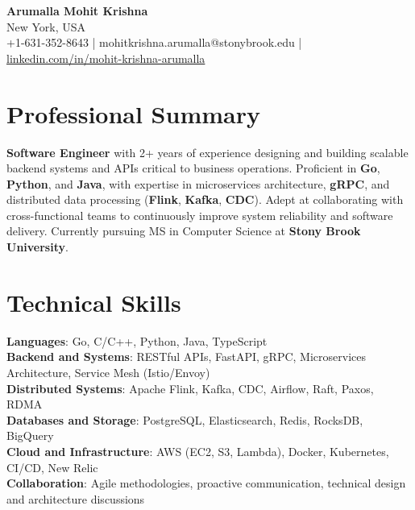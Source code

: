 \documentclass[letterpaper,11pt]{article}
\begin{document}
\begin{center}
  {\Large \textbf{Arumalla Mohit Krishna}} \\
  New York, USA \\
  +1-631-352-8643 \enspace | \enspace mohitkrishna.arumalla@stonybrook.edu \enspace | \enspace \href{https://www.linkedin.com/in/mohit-krishna-arumalla}{linkedin.com/in/mohit-krishna-arumalla}
\end{center}

\section{Professional Summary}
  \begin{itemize}[leftmargin=0.15in, label={}]
    \small{\item{
     \textbf{Software Engineer} with 2+ years of experience designing and building scalable backend systems and APIs critical to business operations. Proficient in \textbf{Go}, \textbf{Python}, and \textbf{Java}, with expertise in microservices architecture, \textbf{gRPC}, and distributed data processing (\textbf{Flink}, \textbf{Kafka}, \textbf{CDC}). Adept at collaborating with cross-functional teams to continuously improve system reliability and software delivery. Currently pursuing MS in Computer Science at \textbf{Stony Brook University}.
    }}
  \end{itemize}
\vspace{-16pt}

\section{Technical Skills}
 \begin{itemize}[leftmargin=0.15in, label={}]
    \small{\item{
     \textbf{Languages}: Go, C/C++, Python, Java, TypeScript \\
     \textbf{Backend and Systems}: RESTful APIs, FastAPI, gRPC, Microservices Architecture, Service Mesh (Istio/Envoy) \\
     \textbf{Distributed Systems}: Apache Flink, Kafka, CDC, Airflow, Raft, Paxos, RDMA \\
     \textbf{Databases and Storage}: PostgreSQL, Elasticsearch, Redis, RocksDB, BigQuery \\
     \textbf{Cloud and Infrastructure}: AWS (EC2, S3, Lambda), Docker, Kubernetes, CI/CD, New Relic \\
     \textbf{Collaboration}: Agile methodologies, proactive communication, technical design and architecture discussions \\
    }}
 \end{itemize}
\vspace{-16pt}
\end{document}
